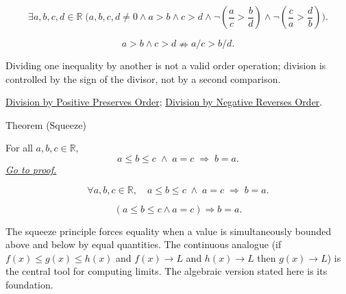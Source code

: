 \begin{remark*}
\[
\exists a,b,c,d\in\mathbb{R}\;
\biggl(a,b,c,d\ne0\land a>b\land c>d
\land \neg\left(\frac ac>\frac bd\right)
\land \neg\left(\frac ca>\frac db\right)\biggr).
\]
\end{remark*}

\begin{remark*}
\[
a>b\land c>d\nRightarrow a/c>b/d.
\]
\end{remark*}

\begin{remark*}[Interpretation]
Dividing one inequality by another is not a valid order operation; division is
controlled by the sign of the divisor, not by a second comparison.
\end{remark*}

\begin{dependencies}
\hyperref[lem:division-by-positive-preserves-order]{Division by Positive Preserves Order};
\hyperref[lem:division-by-negative-reverses-order]{Division by Negative Reverses Order}.
\end{dependencies}


\begin{theorembox}{Theorem (Squeeze)}
\begin{theorem}[Squeeze]
\label{thm:ineq-squeeze}
For all $a, b, c \in \mathbb{R}$,
\[
  a \le b \le c \;\land\; a = c \;\Rightarrow\; b = a.
\]
\hyperref[prf:ineq-squeeze]{\textit{Go to proof.}}
\end{theorem}
\end{theorembox}



\begin{remark*}
\[
  \forall a, b, c \in \mathbb{R},\quad
  a \le b \le c \;\land\; a = c \;\Rightarrow\; b = a.
\]
\end{remark*}

\begin{remark*}
\[
(a\le b\le c\land a=c)\Rightarrow b=a.
\]
\end{remark*}

\begin{remark*}[Interpretation]
The squeeze principle forces equality when a value is simultaneously
bounded above and below by equal quantities.  The continuous analogue
(if $f(x) \le g(x) \le h(x)$ and $f(x) \to L$ and $h(x) \to L$ then
$g(x) \to L$) is the central tool for computing limits.  The algebraic
version stated here is its foundation.
\end{remark*}

